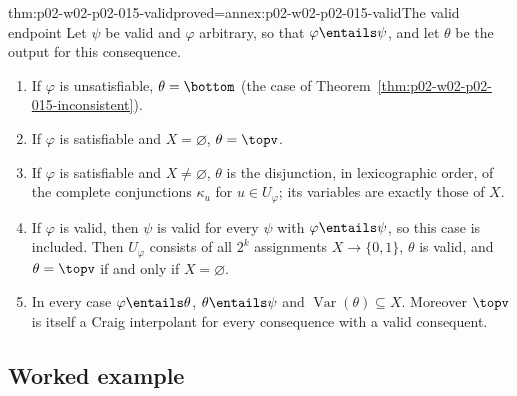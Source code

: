 \begin{hbtheorem}{thm:p02-w02-p02-015-valid}{proved=annex:p02-w02-p02-015-valid}{The valid endpoint}
Let \(\psi\) be valid and \(\varphi\) arbitrary, so that
\(\varphi\entails\psi\), and let \(\theta\) be the output for this
consequence.
\begin{enumerate}
  \item If \(\varphi\) is unsatisfiable, \(\theta=\bottom\) (the case of
        Theorem~\ref{thm:p02-w02-p02-015-inconsistent}).
  \item If \(\varphi\) is satisfiable and \(X=\varnothing\),
        \(\theta=\topv\).
  \item If \(\varphi\) is satisfiable and \(X\neq\varnothing\), \(\theta\) is
        the disjunction, in lexicographic order, of the complete conjunctions
        \(\kappa_u\) for \(u\in U_\varphi\); its variables are exactly those
        of \(X\).
  \item If \(\varphi\) is valid, then \(\psi\) is valid for every \(\psi\) with
        \(\varphi\entails\psi\), so this case is included.  Then
        \(U_\varphi\) consists of all \(2^{k}\) assignments
        \(X\to\{0,1\}\), \(\theta\) is valid, and \(\theta=\topv\) if and
        only if \(X=\varnothing\).
  \item In every case \(\varphi\entails\theta\), \(\theta\entails\psi\) and
        \(\operatorname{Var}(\theta)\subseteq X\).  Moreover \(\topv\) is
        itself a Craig interpolant for every consequence with a valid
        consequent.
\end{enumerate}
\end{hbtheorem}

\subsection{Worked example}
\label{sec:p02-w02-p02-015-example}

